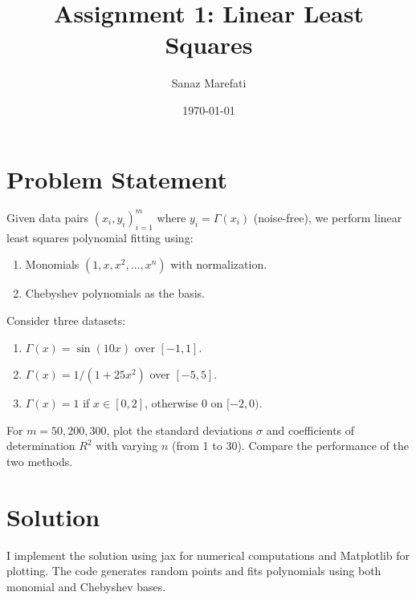 \documentclass[a4paper,12pt]{article}
\title{Assignment 1: Linear Least Squares}
\author{Sanaz Marefati}
\date{\today}
\begin{document}
\maketitle

\section*{Problem Statement}
Given data pairs \((x_i, y_i)_{i=1}^m\) where \(y_i = \Gamma(x_i)\) (noise-free), we perform linear least squares polynomial fitting using:
\begin{enumerate}
    \item Monomials \((1, x, x^2, \ldots, x^n)\) with normalization.
    \item Chebyshev polynomials as the basis.
\end{enumerate}
Consider three datasets:
\begin{enumerate}
    \item \(\Gamma(x) = \sin(10x)\) over \([-1, 1]\).
    \item \(\Gamma(x) = 1/(1 + 25x^2)\) over \([-5, 5]\).
    \item \(\Gamma(x) = 1\) if \(x \in [0, 2]\), otherwise 0 on \([-2, 0)\).
\end{enumerate}
For \(m = 50, 200, 300\), plot the standard deviations \(\sigma\) and coefficients of determination \(R^2\) with varying \(n\) (from 1 to 30). Compare the performance of the two methods.

\section*{Solution}
I implement the solution using jax for numerical computations and Matplotlib for plotting. The code generates random points and fits polynomials using both monomial and Chebyshev bases.
\end{document}
